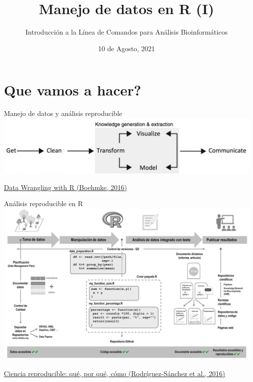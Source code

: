 \documentclass[
  10pt,
  ignorenonframetext,
]{beamer}
\title{Manejo de datos en R (I)}
\author{Introducción a la Línea de Comandos para Análisis
Bioinformáticos}
\date{10 de Agosto, 2021}
\begin{document}
\frame{\titlepage}

\hypertarget{que-vamos-a-hacer}{%
\section{Que vamos a hacer?}\label{que-vamos-a-hacer}}

\begin{frame}{Manejo de datos y análisis reproducible}
\protect\hypertarget{manejo-de-datos-y-anuxe1lisis-reproducible}{}
\includegraphics{../../imgs/analytic_process.png}

\vspace{60pt}

\raggedleft \small \href{http://93.174.95.29/_ads/6F902E466A32011DD94E2B6EEE505F9F}{Data
Wrangling with R (Boehmke, 2016)}
\end{frame}

\begin{frame}{Análisis reproducible en R}
\protect\hypertarget{anuxe1lisis-reproducible-en-r}{}
\includegraphics{../../imgs/analytic_process_R.png}

\raggedleft \small \href{https://revistaecosistemas.net/index.php/ecosistemas/article/view/1178}{Ciencia
reproducible: qué, por qué, cómo (Rodríguez-Sánchez et al., 2016)}
\end{frame}
\end{document}

